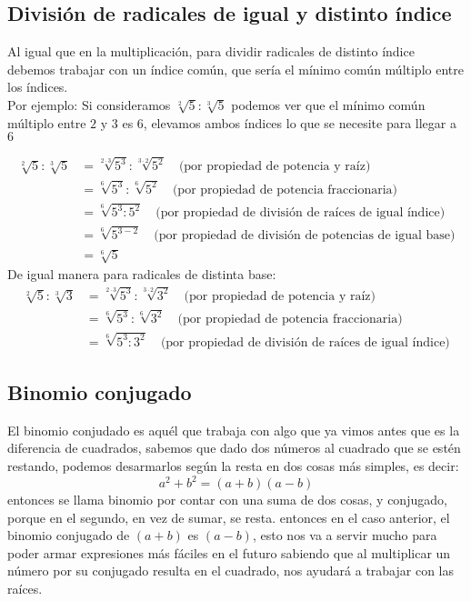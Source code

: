 \documentclass[a4paper]{article}
\begin{document}
\subsection{División de radicales de igual y distinto índice}
Al igual que en la multiplicación, para dividir radicales de distinto índice debemos trabajar con un índice común, que sería el mínimo común múltiplo entre los índices.\\
Por ejemplo: Si consideramos $\sqrt[2]{5} : \sqrt[3]{5}$ podemos ver que el mínimo común múltiplo entre $2$ y $3$ es $6$, elevamos ambos índices lo que se necesite para llegar a $6$ 

\begin{align*}
    \sqrt[2]{5} : \sqrt[3]{5} &= \sqrt[2\cdot 3]{5^3} : \sqrt[3\cdot 2]{5^2} \quad \text{(por propiedad de potencia y raíz)}\\
    &= \sqrt[6]{5^3} : \sqrt[6]{5^2} \quad \text{(por propiedad de potencia fraccionaria)}\\   
    &= \sqrt[6]{5^3:5^2} \quad \text{(por propiedad de división de raíces de igual índice)}\\
    &= \sqrt[6]{5^{3-2}} \quad \text{(por propiedad de división de potencias de igual base)}\\
    &= \sqrt[6]{5}
\end{align*}
De igual manera para radicales de distinta base:
\begin{align*}
    \sqrt[2]{5} : \sqrt[3]{3} &= \sqrt[2\cdot 3]{5^3} : \sqrt[3\cdot 2]{3^2} \quad \text{(por propiedad de potencia y raíz)}\\
    &= \sqrt[6]{5^3} : \sqrt[6]{3^2} \quad \text{(por propiedad de potencia fraccionaria)}\\   
    &= \sqrt[6]{5^3:3^2} \quad \text{(por propiedad de división de raíces de igual índice)}
\end{align*}
\subsection{Binomio conjugado}
El binomio conjudado es aquél que trabaja con algo que ya vimos antes que es la diferencia de cuadrados, sabemos que dado dos números al cuadrado que se estén restando, podemos desarmarlos según la resta en dos cosas más simples, es decir:
\begin{equation*}
    a^2+b^2=(a+b)(a-b)
\end{equation*}
entonces se llama binomio por contar con una suma de dos cosas, y conjugado, porque en el segundo, en vez de sumar, se resta. entonces en el caso anterior, el binomio conjugado de $(a+b)$ es $(a-b)$, esto nos va a servir mucho para poder armar expresiones más fáciles en el futuro sabiendo que al multiplicar un número por su conjugado resulta en el cuadrado, nos ayudará a trabajar con las raíces.
\end{document}
